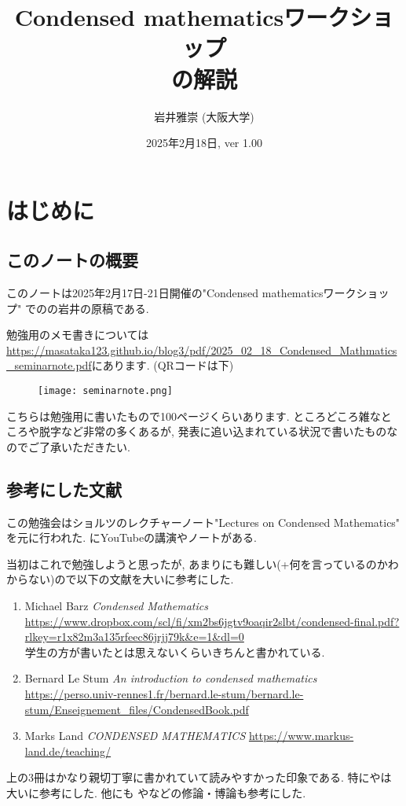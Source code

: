 \documentclass[dvipdfmx,a4paper,11pt]{article}
\title{Condensed mathematicsワークショップ \\ \cite[Section 2.A Appendix]{Sch19}の解説}
\author{岩井雅崇 (大阪大学)}
\date{2025年2月18日, ver 1.00}
\theoremstyle{definition}
\begin{document}
\maketitle
\tableofcontents

\newpage

\setcounter{section}{-1}
\section{はじめに}

\subsection{このノートの概要}
このノートは2025年2月17日-21日開催の"Condensed mathematicsワークショップ"
での\cite[Section 2.A Appendix]{Sch19}の岩井の原稿である.

勉強用のメモ書きについては\url{https://masataka123.github.io/blog3/pdf/2025_02_18_Condensed_Mathmatics_seminarnote.pdf}にあります. (QRコードは下)
\begin{figure}[htbp]
\begin{center}
 \texttt{[image: seminarnote.png]}
\end{center}
\end{figure}
こちらは勉強用に書いたもので100ページくらいあります.
ところどころ雑なところや脱字など非常の多くあるが, 発表に追い込まれている状況で書いたものなのでご了承いただきたい. %

\subsection{参考にした文献}
この勉強会はショルツのレクチャーノート"Lectures on Condensed Mathematics"\cite{Sch19}
を元に行われた. \cite{SchClau}にYouTubeの講演やノートがある.

当初はこれで勉強しようと思ったが, あまりにも難しい(+何を言っているのかわからない)ので以下の文献を大いに参考にした.
\begin{enumerate}
\item \cite{Bar22}
Michael Barz \textit{Condensed Mathematics} \\
\url{https://www.dropbox.com/scl/fi/xm2bs6jgtv9oaqir2slbt/condensed-final.pdf?rlkey=r1x82m3a135rfeec86jrjj79k&e=1&dl=0} \\
学生の方が書いたとは思えないくらいきちんと書かれている.
\item \cite{Stum} Bernard Le Stum
\textit{An introduction to condensed mathematics}
\url{https://perso.univ-rennes1.fr/bernard.le-stum/bernard.le-stum/Enseignement_files/CondensedBook.pdf} 
\item \cite{Land} Marks Land \textit{CONDENSED MATHEMATICS}
\url{https://www.markus-land.de/teaching/}
\end{enumerate}
上の3冊はかなり親切丁寧に書かれていて読みやすかった印象である. 特に\cite{Stum}や\cite{Bar22}は大いに参考にした. 他にも\cite{Asg} や\cite{Lep}などの修論・博論も参考にした. 
\end{document}
